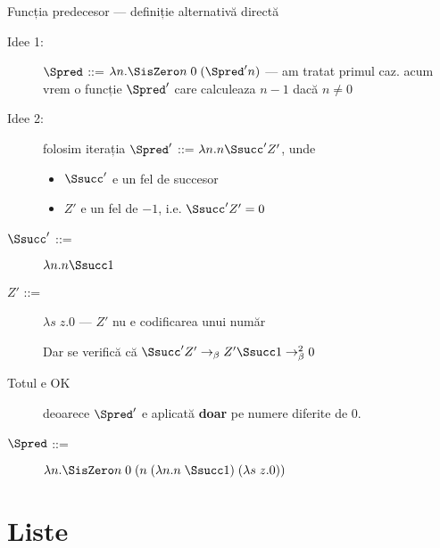 \documentclass[xcolor=pdftex,romanian,colorlinks]{beamer}
\begin{document}
\begin{frame}{Funcția predecesor --- definiție alternativă directă}

  \begin{description}
    \item[Idee 1:] $\Spred$ ::= $\lambda n.\SisZero n\; 0\;  (\Spred' n)$
           --- am tratat primul caz. acum vrem o funcție $\Spred'$ care calculeaza $n-1$ dacă $n\neq 0$
    \item[Idee 2:] folosim iterația $\Spred'$ ::= $\lambda n. n \Ssucc' Z'$, unde
         \begin{itemize}
          \item $\Ssucc'$ e un fel de succesor
          \item $Z'$ e un fel de $-1$, i.e. $\Ssucc' Z' = 0$
         \end{itemize}
    \item[$\Ssucc'$ ::= ] $\lambda n. n \Ssucc 1$
    \item[$Z'$ ::= ] $\lambda s\; z.0$ --- $Z'$ nu e codificarea unui număr

    Dar se verifică că $\Ssucc' Z' \rightarrow_\beta Z' \Ssucc 1 \rightarrow^2_\beta 0$

    \item[Totul e OK] deoarece $\Spred'$ e aplicată {\bf doar} pe numere diferite de 0.
    \item[$\Spred$ ::= ] $\lambda n.\SisZero n\; 0\; (n \; (\lambda n.n\; \Ssucc 1)\; (\lambda s\; z.0))$
  \end{description}
\end{frame}


\section{Liste}

\newcommand{\Snull}{\terminal{null}}
\newcommand{\Scons}{\terminal{cons}}
\newcommand{\Shead}{\terminal{head}}
\newcommand{\SisNull}{\terminal{?null=}}
\newcommand{\Stail}{\terminal{tail}}
\newcommand{\Ssum}{\terminal{sum}}
\newcommand{\Sfoldr}{\terminal{foldr}}
\newcommand{\Smap}{\terminal{map}}
\newcommand{\Sfilter}{\terminal{filter}}
\end{document}
